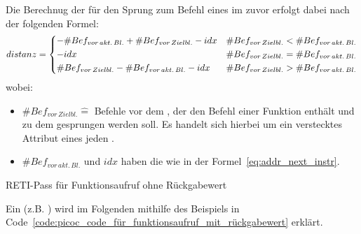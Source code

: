 \begin{Special_Paragraph}
  Die Berechnug der   für den Sprung  zum  Befehl eines im  zuvor  erfolgt dabei nach der folgenden Formel:
  \begin{equation}
    distanz = \begin{dcases}
      -\#Bef_{vor\, akt.\, Bl.} + \#Bef_{vor\, Zielbl.} - idx & \#Bef_{vor\, Zielbl.} < \#Bef_{vor\, akt.\, Bl.} \\
      -idx & \#Bef_{vor\, Zielbl.} = \#Bef_{vor\, akt.\, Bl.} \\
      \#Bef_{vor\, Zielbl.} - \#Bef_{vor\, akt.\, Bl.} - idx & \#Bef_{vor\, Zielbl.} > \#Bef_{vor\, akt.\, Bl.}
    \end{dcases}
  \end{equation}
  wobei:
  \begin{itemize}
    \item $\#Bef_{vor\, Zielbl.} \hat=$  Befehle vor dem , der den  Befehl einer Funktion enthält und zu dem gesprungen werden soll. Es handelt sich hierbei um ein \textcolor{gray!90!black}{verstecktes Attribut}  eines jeden  .
    \item $\#Bef_{vor\,akt.\,Bl.}$ und $idx$ haben die  wie in der Formel~\ref{eq:addr_next_instr}.
  \end{itemize}
\end{Special_Paragraph}

\begin{code}
  \centering
  \caption{RETI-Pass für Funktionsaufruf ohne Rückgabewert}
  \label{code:reti_pass_für_funktionsaufruf_ohne_rückgabewert}
\end{code}

\label{sec:rückgabewert}

Ein  (z.B. ) wird im Folgenden mithilfe des Beispiels in Code~\ref{code:picoc_code_für_funktionsaufruf_mit_rückgabewert} erklärt.

